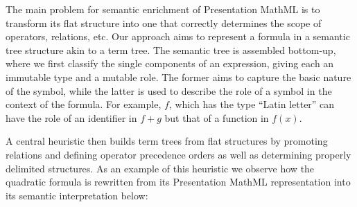 \documentclass[12pt]{amsart}
\begin{document}
The main problem for semantic enrichment of Presentation MathML is to transform 
its flat structure into one that correctly determines the scope of operators, 
relations, etc.  Our approach aims to represent a formula in a semantic tree 
structure akin to a term tree. The semantic tree is assembled bottom-up, where 
we first classify the single components of an expression, giving each an 
immutable type and a mutable role. The former aims to capture the basic nature 
of the symbol, while the latter is used to describe the role of a symbol in the 
context of the formula. For example, $f$, which has the type ``Latin letter'' 
can have the role of an identifier in $f + g$ but that of a function in 
$f(x)$.

A central heuristic then builds term trees from flat structures by promoting 
relations and defining operator precedence orders as well as determining 
properly delimited structures. As an example of this heuristic we observe how 
the quadratic formula is rewritten from its Presentation MathML representation 
into its semantic interpretation below:
\end{document}
